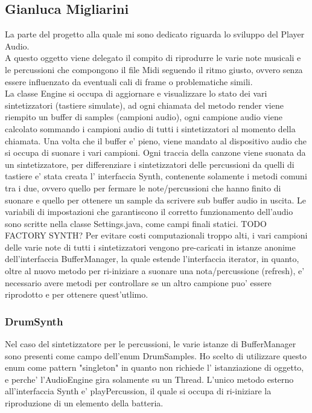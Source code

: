 \documentclass[a4paper,12pt]{report}
\begin{document}
\subsection{Gianluca Migliarini}
La parte del progetto alla quale mi sono dedicato riguarda lo sviluppo del Player Audio. \\
A questo oggetto viene delegato il compito di riprodurre le varie note musicali e le percussioni che compongono il file Midi seguendo il ritmo giusto, ovvero senza essere influenzato da eventuali cali di frame o problematiche simili. \\
La classe Engine si occupa di aggiornare e visualizzare lo stato dei vari sintetizzatori (tastiere simulate),
ad ogni chiamata del metodo render viene riempito un buffer di samples (campioni audio), ogni campione audio viene calcolato sommando i campioni audio di tutti i sintetizzatori al momento della chiamata.
Una volta che il buffer e' pieno, viene mandato al dispositivo audio che si occupa di suonare i vari campioni.
Ogni traccia della canzone viene suonata da un sintetizzatore, per differenziare i sintetizzatori delle percussioni da quelli di tastiere e' stata creata l' interfaccia Synth, contenente solamente i metodi comuni tra i due, ovvero quello per fermare le note/percussioni che hanno finito di suonare e quello per ottenere un sample da scrivere sub buffer audio in uscita. 
Le variabili di impostazioni che garantiscono il corretto funzionamento dell'audio sono scritte nella classe Settings.java, come campi finali statici.
TODO FACTORY SYNTH?
Per evitare costi computazionali troppo alti, i vari campioni delle varie note di tutti i sintetizzatori vengono pre-caricati in istanze anonime dell'interfaccia BufferManager, la quale estende l'interfaccia iterator, in quanto, oltre al nuovo metodo per ri-iniziare a suonare una nota/percussione (refresh), e' necessario avere metodi per controllare se un altro campione puo' essere riprodotto e per ottenere quest'utlimo.
\subsubsection{DrumSynth}
Nel caso del sintetizzatore per le percussioni, le varie istanze di BufferManager sono presenti come campo dell'enum DrumSamples. Ho scelto di utilizzare questo enum come pattern "singleton" in quanto non richiede l' istanziazione di oggetto, e perche' l'AudioEngine gira solamente su un Thread.
L'unico metodo esterno all'interfaccia Synth e' playPercussion, il quale si occupa di ri-iniziare la riproduzione di un elemento della batteria.
\end{document}
